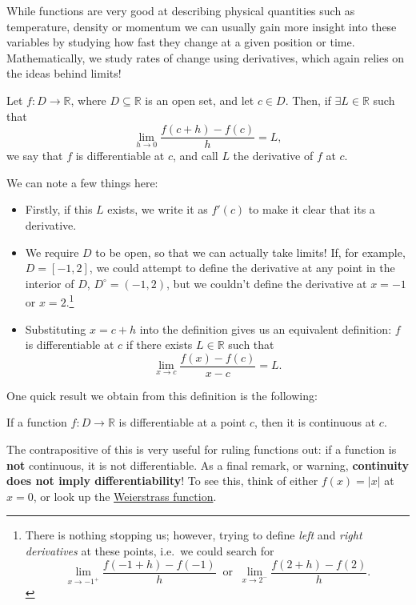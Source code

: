 \documentclass[
  10pt,
  a4paper]{article}
\providecommand{\tightlist}{%
  \setlength{\itemsep}{0pt}\setlength{\parskip}{0pt}}
\theoremstyle{plain}
\theoremstyle{definition}
\theoremstyle{plain}
\theoremstyle{plain}
\theoremstyle{plain}
\theoremstyle{plain}
\theoremstyle{definition}
\theoremstyle{definition}
\theoremstyle{remark}
\theoremstyle{remark}
\let\BeginKnitrBlock\begin \let\EndKnitrBlock\end
\begin{document}
While functions are very good at describing physical quantities such as temperature, density or momentum we can usually gain more insight into these variables by studying how fast they change at a given position or time. Mathematically, we study rates of change using derivatives, which again relies on the ideas behind limits!

\BeginKnitrBlock{definition}[Derivative]
{\label{def:def2} }Let \(f: D \to \mathbb{R}\), where \(D \subseteq \mathbb{R}\) is an open set, and let \(c \in D\). Then, if \(\exists L \in \mathbb{R}\) such that \[\lim_{h \to 0}\frac{f(c+h) - f(c)}{h} = L,\] we say that \(f\) is differentiable at \(c\), and call \(L\) the derivative of \(f\) at \(c\).
\EndKnitrBlock{definition}
We can note a few things here:

\begin{itemize}
\tightlist
\item
  Firstly, if this \(L\) exists, we write it as \(f'(c)\) to make it clear that its a derivative.
\item
  We require \(D\) to be open, so that we can actually take limits! If, for example, \(D = [-1,2]\), we could attempt to define the derivative at any point in the interior of \(D\), \(D^{\circ} = (-1,2)\), but we couldn't define the derivative at \(x = -1\) or \(x = 2\).\footnote{There is nothing stopping us; however, trying to define \emph{left} and \emph{right derivatives} at these points, i.e.~we could search for \[\lim_{x \to -1^{+}}\frac{f(-1+h) - f(-1)}{h}\;\;\text{or}\;\;\lim_{x \to 2^{-}}\frac{f(2+h) - f(2)}{h}.\]}
\item
  Substituting \(x = c+h\) into the definition gives us an equivalent definition: \(f\) is differentiable at \(c\) if there exists \(L\in\mathbb{R}\) such that \[\lim_{x \to c}\frac{f(x) - f(c)}{x - c} = L.\]
\end{itemize}

One quick result we obtain from this definition is the following:
\BeginKnitrBlock{proposition}
{\label{prp:prop2} }If a function \(f:D \to \mathbb{R}\) is differentiable at a point \(c\), then it is continuous at \(c\).
\EndKnitrBlock{proposition}
The contrapositive of this is very useful for ruling functions out: if a function is \textbf{not} continuous, it is not differentiable. As a final remark, or warning, \textbf{continuity does not imply differentiability}! To see this, think of either \(f(x) = \lvert x \rvert\) at \(x = 0\), or look up the \href{https://en.wikipedia.org/wiki/Weierstrass_function}{Weierstrass function}.
\end{document}
